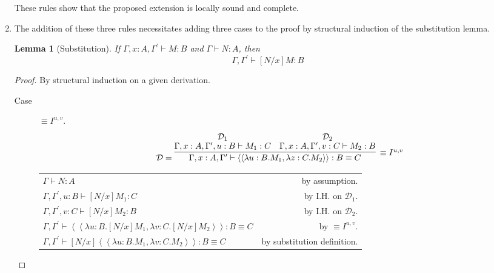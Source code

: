 \documentclass[11pt,letterpaper]{article}
\newtheorem{lemma}{Lemma}
\newcommand{\proves}{\vdash}
\newcommand{\equivproofterm}[6]{
    \left \langle \left \langle
        \lambda #1 : #2 . #3,
        \lambda #4 : #5 . #6
    \right \rangle \right \rangle : #2 \equiv #5
}
\begin{document}
\begin{enumerate}
        These rules show that the proposed extension is locally sound and
        complete.

    \item
        The addition of these three rules necessitates adding three cases to
        the proof by structural induction of the substitution lemma.

        \begin{lemma}[Substitution]
            If $\Gamma, x:A, \Gamma^\prime \proves M : B$
            and $\Gamma \proves N : A$, then
            $$
            \Gamma, \Gamma^\prime \proves [N/x]M : B
            $$
        \end{lemma}


        \begin{proof} By structural induction on a given derivation.

            \begin{description}
                \item[Case] $\equiv I^{u, v}$.
                    $$
                    \mathcal{D} = \infer[\equiv I^{u, v}]{
                        \Gamma, x:A, \Gamma^\prime
                        \proves
                        \equivproofterm{u}{B}{M_1}{z}{C}{M_2}
                    }{
                        \deduce[\mathcal{D}_1]{
                            \Gamma, x:A, \Gamma^\prime, u:B \proves M_1 : C
                        }{}
                        &
                        \deduce[\mathcal{D}_2]{
                            \Gamma, x:A, \Gamma^\prime, v:C \proves M_2 : B
                        }{}
                    }
                    $$

                    \begin{center}
                        \begin{tabular}{l r}
                            $\Gamma \proves N : A$
                            &
                            by assumption. \\
                            $\Gamma, \Gamma^\prime, u:B \proves [N/x]M_1 : C$
                            &
                            by I.H. on $\mathcal{D}_1$. \\
                            $\Gamma, \Gamma^\prime, v:C \proves [N/x]M_2 : B$
                            &
                            by I.H. on $\mathcal{D}_2$. \\
                            $
                            \Gamma, \Gamma^\prime
                            \proves
                            \equivproofterm{u}{B}{[N/x]M_1}{v}{C}{[N/x]M_2}
                            $
                            &
                            by $\equiv I^{u, v}$. \\
                            $
                            \Gamma, \Gamma^\prime
                            \proves
                            [N/x]\equivproofterm{u}{B}{M_1}{v}{C}{M_2}
                            $
                            &
                            by substitution definition. \\
                        \end{tabular}
                    \end{center}


\end{description}
\end{proof}
\end{enumerate}
\end{document}
